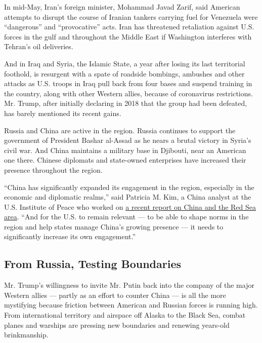 In mid-May, Iran's foreign minister, Mohammad Javad Zarif, said American
attempts to disrupt the course of Iranian tankers carrying fuel for
Venezuela were ``dangerous'' and ``provocative'' acts. Iran has
threatened retaliation against U.S. forces in the gulf and throughout
the Middle East if Washington interferes with Tehran's oil deliveries.

And in Iraq and Syria, the Islamic State, a year after losing its last
territorial foothold, is resurgent with a spate of roadside bombings,
ambushes and other attacks as U.S. troops in Iraq pull back from four
bases and suspend training in the country, along with other Western
allies, because of coronavirus restrictions. Mr. Trump, after initially
declaring in 2018 that the group had been defeated, has barely mentioned
its recent gains.

Russia and China are active in the region. Russia continues to support
the government of President Bashar al-Assad as he nears a brutal victory
in Syria's civil war. And China maintains a military base in Djibouti,
near an American one there. Chinese diplomats and state-owned
enterprises have increased their presence throughout the region.

``China has significantly expanded its engagement in the region,
especially in the economic and diplomatic realms,'' said Patricia M.
Kim, a China analyst at the U.S. Institute of Peace who worked on
\href{https://www.usip.org/publications/2020/04/chinas-impact-conflict-dynamics-red-sea-arena}{a
recent report on China and the Red Sea area}. ``And for the U.S. to
remain relevant --- to be able to shape norms in the region and help
states manage China's growing presence --- it needs to significantly
increase its own engagement.''

\hypertarget{from-russia-testing-boundaries}{%
\subsection{From Russia, Testing
Boundaries}\label{from-russia-testing-boundaries}}

Mr. Trump's willingness to invite Mr. Putin back into the company of the
major Western allies --- partly as an effort to counter China --- is all
the more mystifying because friction between American and Russian forces
is running high. From international territory and airspace off Alaska to
the Black Sea, combat planes and warships are pressing new boundaries
and renewing years-old brinkmanship.

